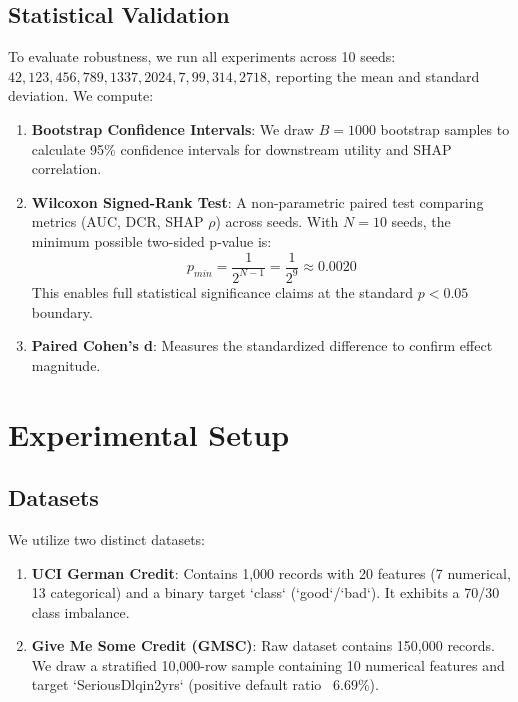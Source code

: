 \documentclass[journal]{IEEEtran}
\begin{document}
\subsection{Statistical Validation}
To evaluate robustness, we run all experiments across 10 seeds: $42, 123, 456, 789, 1337, 2024, 7, 99, 314, 2718$, reporting the mean and standard deviation. We compute:
\begin{enumerate}
    \item \textbf{Bootstrap Confidence Intervals}: We draw $B=1000$ bootstrap samples to calculate 95\% confidence intervals for downstream utility and SHAP correlation.
    \item \textbf{Wilcoxon Signed-Rank Test}: A non-parametric paired test comparing metrics (AUC, DCR, SHAP $\rho$) across seeds. With $N=10$ seeds, the minimum possible two-sided p-value is:
    \begin{equation}
        p_{min} = \frac{1}{2^{N-1}} = \frac{1}{2^9} \approx 0.0020
    \end{equation}
    This enables full statistical significance claims at the standard $p < 0.05$ boundary.
    \item \textbf{Paired Cohen's d}: Measures the standardized difference to confirm effect magnitude.
\end{enumerate}

\section{Experimental Setup}
\label{sec:experimental_setup}

\subsection{Datasets}
We utilize two distinct datasets:
\begin{enumerate}
    \item \textbf{UCI German Credit}: Contains 1,000 records with 20 features (7 numerical, 13 categorical) and a binary target `class` (`good`/`bad`). It exhibits a 70/30 class imbalance.
    \item \textbf{Give Me Some Credit (GMSC)}: Raw dataset contains 150,000 records. We draw a stratified 10,000-row sample containing 10 numerical features and target `SeriousDlqin2yrs` (positive default ratio ~6.69\%).
\end{enumerate}
\end{document}
